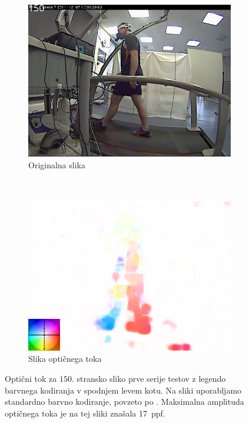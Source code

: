 \begin{figure}[!htb]
	\centering
	\begin{subfigure}{0.45\columnwidth}
		\includegraphics[width=\columnwidth]{./Slike/normal-sv-150.png}
		\caption{Originalna slika}
	\end{subfigure}
	~
	\begin{subfigure}{0.45\columnwidth}
	    \includegraphics[width=\columnwidth, frame]{./Slike/normal-sv-of-coded-150.png}
		\caption{Slika optičnega toka}
	\end{subfigure}
    \caption[Optični tok za $150$. stransko sliko prve serije testov z legendo barvnega kodiranja]{Optični tok za $150$. stransko sliko prve serije testov z legendo barvnega kodiranja v spodnjem levem kotu. Na sliki uporabljamo standardno barvno kodiranje, povzeto po \cite{baker2011database}. Maksimalna amplituda optičnega toka je na tej sliki znašala \SI{17}{ppf}.}
    \label{fig:opticni-tok-stage1}
\end{figure}


